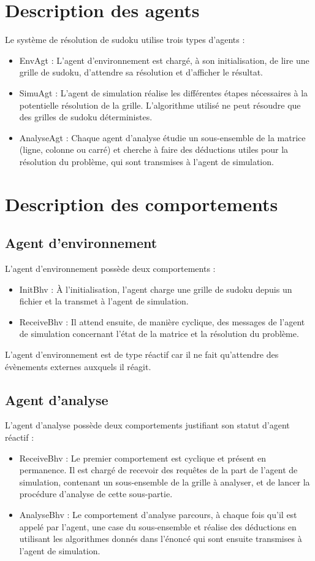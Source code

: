 \documentclass[a4paper,11pt]{article}
\begin{document}


\newpage
\section{Description des agents}
Le système de résolution de sudoku utilise trois types d'agents :
\begin{itemize}
\item EnvAgt : L'agent d'environnement est chargé, à son initialisation, de lire une grille de sudoku, d'attendre sa résolution et d'afficher le résultat.
\item SimuAgt : L'agent de simulation réalise les différentes étapes nécessaires à la potentielle résolution de la grille.
L'algorithme utilisé ne peut résoudre que des grilles de sudoku déterministes.
\item AnalyseAgt : Chaque agent d'analyse étudie un sous-ensemble de la matrice (ligne, colonne ou carré) et cherche à faire des déductions utiles pour la résolution du problème, qui sont transmises à l'agent de simulation. 
\end{itemize}

\section{Description des comportements}
\subsection{Agent d'environnement}
L'agent d'environnement possède deux comportements :
\begin{itemize}
\item InitBhv : À l'initialisation, l'agent charge une grille de sudoku depuis un fichier et la transmet à l'agent de simulation.
\item ReceiveBhv : Il attend ensuite, de manière cyclique, des messages de l'agent de simulation concernant l'état de la matrice et la résolution du problème. 
\end{itemize}
L'agent d'environnement est de type réactif car il ne fait qu'attendre des évènements externes auxquels il réagit.

\subsection{Agent d'analyse}
L'agent d'analyse possède deux comportements justifiant son statut d'agent réactif :
\begin{itemize}
\item ReceiveBhv : Le premier comportement est cyclique et présent en permanence. Il est chargé de recevoir des requêtes de la part de l'agent de simulation, contenant un sous-ensemble de la grille à analyser, et de lancer la procédure d'analyse de cette sous-partie.
\item AnalyseBhv : Le comportement d'analyse parcours, à chaque fois qu'il est appelé par l'agent, une case du sous-ensemble et réalise des déductions en utilisant les algorithmes donnés dans l'énoncé qui sont ensuite transmises à l'agent de simulation.
\end{itemize}
\end{document}
